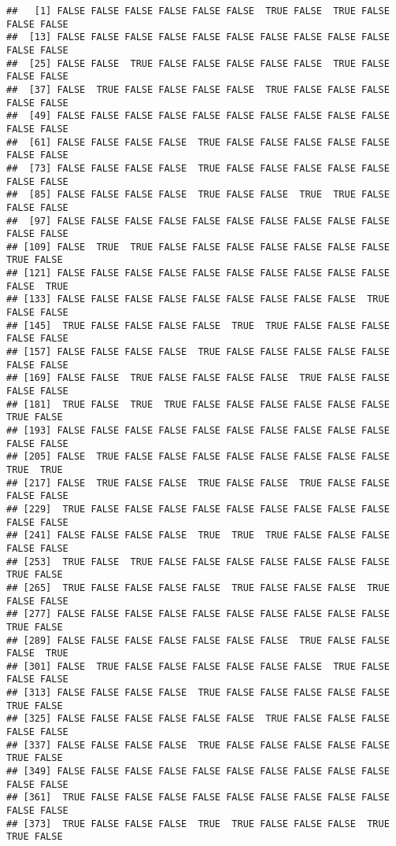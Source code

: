 \documentclass[
]{book}
\begin{document}
\begin{verbatim}
##   [1] FALSE FALSE FALSE FALSE FALSE FALSE  TRUE FALSE  TRUE FALSE FALSE FALSE
##  [13] FALSE FALSE FALSE FALSE FALSE FALSE FALSE FALSE FALSE FALSE FALSE FALSE
##  [25] FALSE FALSE  TRUE FALSE FALSE FALSE FALSE FALSE  TRUE FALSE FALSE FALSE
##  [37] FALSE  TRUE FALSE FALSE FALSE FALSE  TRUE FALSE FALSE FALSE FALSE FALSE
##  [49] FALSE FALSE FALSE FALSE FALSE FALSE FALSE FALSE FALSE FALSE FALSE FALSE
##  [61] FALSE FALSE FALSE FALSE  TRUE FALSE FALSE FALSE FALSE FALSE FALSE FALSE
##  [73] FALSE FALSE FALSE FALSE  TRUE FALSE FALSE FALSE FALSE FALSE FALSE FALSE
##  [85] FALSE FALSE FALSE FALSE  TRUE FALSE FALSE  TRUE  TRUE FALSE FALSE FALSE
##  [97] FALSE FALSE FALSE FALSE FALSE FALSE FALSE FALSE FALSE FALSE FALSE FALSE
## [109] FALSE  TRUE  TRUE FALSE FALSE FALSE FALSE FALSE FALSE FALSE  TRUE FALSE
## [121] FALSE FALSE FALSE FALSE FALSE FALSE FALSE FALSE FALSE FALSE FALSE  TRUE
## [133] FALSE FALSE FALSE FALSE FALSE FALSE FALSE FALSE FALSE  TRUE FALSE FALSE
## [145]  TRUE FALSE FALSE FALSE FALSE  TRUE  TRUE FALSE FALSE FALSE FALSE FALSE
## [157] FALSE FALSE FALSE FALSE  TRUE FALSE FALSE FALSE FALSE FALSE FALSE FALSE
## [169] FALSE FALSE  TRUE FALSE FALSE FALSE FALSE  TRUE FALSE FALSE FALSE FALSE
## [181]  TRUE FALSE  TRUE  TRUE FALSE FALSE FALSE FALSE FALSE FALSE  TRUE FALSE
## [193] FALSE FALSE FALSE FALSE FALSE FALSE FALSE FALSE FALSE FALSE FALSE FALSE
## [205] FALSE  TRUE FALSE FALSE FALSE FALSE FALSE FALSE FALSE FALSE  TRUE  TRUE
## [217] FALSE  TRUE FALSE FALSE  TRUE FALSE FALSE  TRUE FALSE FALSE FALSE FALSE
## [229]  TRUE FALSE FALSE FALSE FALSE FALSE FALSE FALSE FALSE FALSE FALSE FALSE
## [241] FALSE FALSE FALSE FALSE  TRUE  TRUE  TRUE FALSE FALSE FALSE FALSE FALSE
## [253]  TRUE FALSE  TRUE FALSE FALSE FALSE FALSE FALSE FALSE FALSE  TRUE FALSE
## [265]  TRUE FALSE FALSE FALSE FALSE  TRUE FALSE FALSE FALSE  TRUE FALSE FALSE
## [277] FALSE FALSE FALSE FALSE FALSE FALSE FALSE FALSE FALSE FALSE  TRUE FALSE
## [289] FALSE FALSE FALSE FALSE FALSE FALSE FALSE  TRUE FALSE FALSE FALSE  TRUE
## [301] FALSE  TRUE FALSE FALSE FALSE FALSE FALSE FALSE  TRUE FALSE FALSE FALSE
## [313] FALSE FALSE FALSE FALSE  TRUE FALSE FALSE FALSE FALSE FALSE  TRUE FALSE
## [325] FALSE FALSE FALSE FALSE FALSE FALSE  TRUE FALSE FALSE FALSE FALSE FALSE
## [337] FALSE FALSE FALSE FALSE  TRUE FALSE FALSE FALSE FALSE FALSE  TRUE FALSE
## [349] FALSE FALSE FALSE FALSE FALSE FALSE FALSE FALSE FALSE FALSE FALSE FALSE
## [361]  TRUE FALSE FALSE FALSE FALSE FALSE FALSE FALSE FALSE FALSE FALSE FALSE
## [373]  TRUE FALSE FALSE FALSE  TRUE  TRUE FALSE FALSE FALSE  TRUE  TRUE FALSE

\end{verbatim}
\end{document}
